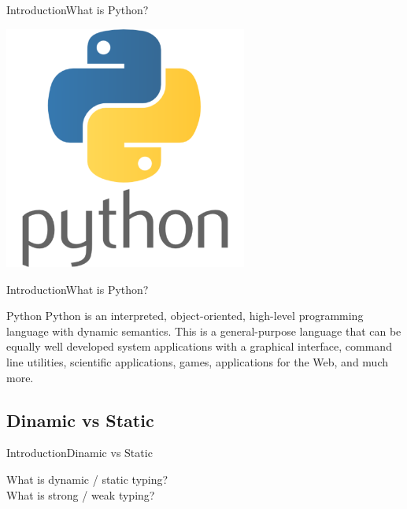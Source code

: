 \documentclass[10pt]{beamer}
\begin{document}
\begin{frame}{Introduction}{What is Python?}
	\begin{center}
		\includegraphics[width=0.6\textwidth]{pictures/python.png}
	\end{center}
\end{frame}

\begin{frame}{Introduction}{What is Python?}
	\begin{block}{Python}
		Python is an interpreted, object-oriented, high-level programming language with dynamic semantics.  This is a general-purpose language that can be equally well developed system applications with a graphical interface, command line utilities, scientific applications, games, applications for the Web, and much more.	
	\end{block}
\end{frame}

\subsection{Dinamic vs Static}
\begin{frame}[fragile]{Introduction}{Dinamic vs Static}
	\begin{center}
		\LARGE What is dynamic / static typing? \\
		\pause
		\LARGE What is strong / weak typing?
	\end{center}
\end{frame}
\end{document}
